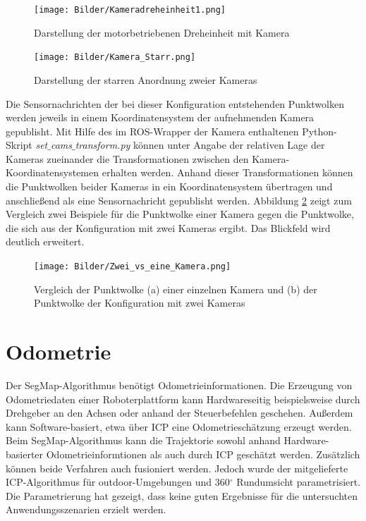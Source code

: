 \begin{figure}
	\centering
	\begin {minipage}[t]{0.45\linewidth}
	\centering
	\texttt{[image: Bilder/Kameradreheinheit1.png]}
	\caption{Darstellung der motorbetriebenen Dreheinheit mit Kamera}
	\label{fig:Dreheinheit}
	\label{fig:Kamera_Starr}
\end{minipage}
\hfill
 \begin{minipage}[t]{0.45\linewidth}
	\centering
	\texttt{[image: Bilder/Kamera\_Starr.png]}
	\caption{Darstellung der starren Anordnung zweier Kameras}
	\label{fig:Kamera_Starr}
\end{minipage}
\end{figure}

Die Sensornachrichten der bei dieser Konfiguration entstehenden Punktwolken werden jeweils in einem Koordinatensystem der aufnehmenden Kamera gepublisht. Mit Hilfe des im ROS-Wrapper der Kamera enthaltenen Python-Skript \textit{set$\_$cams$\_$transform.py} können unter Angabe der relativen Lage der Kameras zueinander die Transformationen zwischen den Kamera-Koordinatensystemen erhalten werden. Anhand dieser Transformationen können die Punktwolken beider Kameras in ein Koordinatensystem übertragen und anschließend als eine Sensornachricht gepublisht werden. Abbildung \ref{fig:stereo} zeigt zum Vergleich zwei Beispiele für die Punktwolke einer Kamera gegen die Punktwolke, die sich aus der Konfiguration mit zwei Kameras ergibt. Das Blickfeld wird deutlich erweitert. 

\begin{figure}
	\centering
	\texttt{[image: Bilder/Zwei\_vs\_eine\_Kamera.png]}
	\caption{Vergleich der Punktwolke (a) einer einzelnen Kamera und (b) der Punktwolke der Konfiguration mit zwei Kameras }
	\label{fig:stereo}
\end{figure}


\section[Odometrie (Kopp)]{Odometrie}

Der SegMap-Algorithmus benötigt Odometrieinformationen. Die Erzeugung von Odometriedaten einer Roboterplattform kann Hardwareseitig beispielsweise durch Drehgeber an den Achsen oder anhand der Steuerbefehlen geschehen. Außerdem kann Software-basiert, etwa über ICP eine Odometrieschätzung erzeugt werden. Beim SegMap-Algorithmus kann die Trajektorie sowohl anhand Hardware-basierter Odometrieinformtionen als auch durch ICP geschätzt werden. Zusätzlich können beide Verfahren auch fusioniert werden. Jedoch wurde der mitgelieferte ICP-Algorithmus für outdoor-Umgebungen und 360$^\circ$ Rundumsicht parametrisiert. Die Parametrierung hat gezeigt, dass keine guten Ergebnisse für die untersuchten Anwendungsszenarien erzielt werden. 

